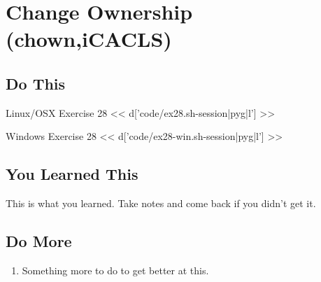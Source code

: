 \chapter{Change Ownership (chown,iCACLS)}

\section{Do This}

\begin{code}{Linux/OSX Exercise 28}
<< d['code/ex28.sh-session|pyg|l'] >>
\end{code}

\begin{code}{Windows Exercise 28}
<< d['code/ex28-win.sh-session|pyg|l'] >>
\end{code}

\section{You Learned This}

This is what you learned.  Take notes and come back if you didn't get it.

\section{Do More}

\begin{enumerate}
\item Something more to do to get better at this.
\end{enumerate}

